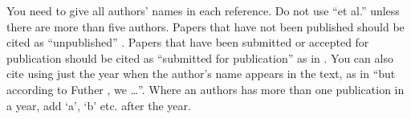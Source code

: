 \documentclass[12pt,a4paper]{article}
\begin{document}
You need to give all authors' names in each reference.  Do not use ``et al.'' unless there are more than five authors.  Papers that have not been published should be cited as ``unpublished'' \cite{euther}.  Papers that have been submitted or accepted for publication should be cited as ``submitted for publication'' as in \cite{futher} .  You can also cite using just the year when the author's name appears in the text, as in ``but according to Futher \citeyear{futher}, we \dots''.  Where an authors has more than one publication in a year, add `a', `b' etc. after the year.





\end{document}
